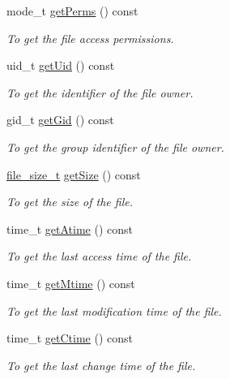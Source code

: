 \begin{DoxyCompactItemize}
mode\_\-t \hyperlink{classFile_a3f9864e22e0eec72e1b4884c2779100f}{getPerms} () const 
\begin{DoxyCompactList}\small\item\em To get the file access permissions. \item\end{DoxyCompactList}\item 
uid\_\-t \hyperlink{classFile_a328160d52f616869a8994d6d0a85f8a6}{getUid} () const 
\begin{DoxyCompactList}\small\item\em To get the identifier of the file owner. \item\end{DoxyCompactList}\item 
gid\_\-t \hyperlink{classFile_ac608e5021f47b280aa00229e34f19d28}{getGid} () const 
\begin{DoxyCompactList}\small\item\em To get the group identifier of the file owner. \item\end{DoxyCompactList}\item 
\hyperlink{File_8hpp_aaf19f83503293d8d9fb6c5f7607cb5ee}{file\_\-size\_\-t} \hyperlink{classFile_a96ab72424a4cab2a671892bc2cd22982}{getSize} () const 
\begin{DoxyCompactList}\small\item\em To get the size of the file. \item\end{DoxyCompactList}\item 
time\_\-t \hyperlink{classFile_ae5b150a9c6382290f8a491514cd56477}{getAtime} () const 
\begin{DoxyCompactList}\small\item\em To get the last access time of the file. \item\end{DoxyCompactList}\item 
time\_\-t \hyperlink{classFile_a204776a581f17a1885da8558b1ee68ec}{getMtime} () const 
\begin{DoxyCompactList}\small\item\em To get the last modification time of the file. \item\end{DoxyCompactList}\item 
time\_\-t \hyperlink{classFile_a44da403de6230a3a06acb9adbb0d63c9}{getCtime} () const 
\begin{DoxyCompactList}\small\item\em To get the last change time of the file. \item\end{DoxyCompactList}\item 

\end{DoxyCompactItemize}
